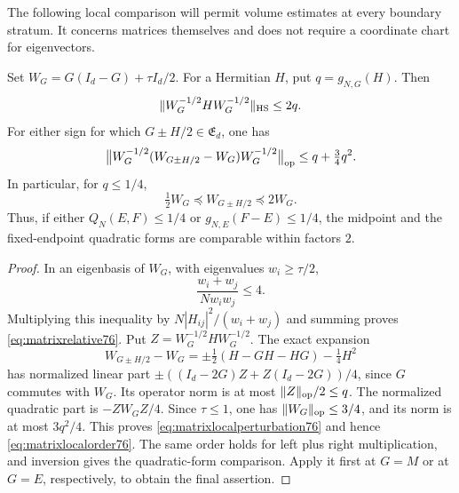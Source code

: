 The following local comparison will permit volume estimates at
every boundary stratum.  It concerns matrices themselves and
does not require a coordinate chart for eigenvectors.

\begin{lemma}
\label{lem:matrixlocal76}
Set $W_G=G(I_d-G)+\tau I_d/2$.  For a Hermitian $H$, put
$q=g_{N,G}(H)$.  Then
\begin{equation}\label{eq:matrixrelative76}
 \|W_G^{-1/2}HW_G^{-1/2}\|_{\rm HS}\le2q.
\end{equation}
For either sign for which $G\pm H/2\in\mathfrak E_d$, one has
\begin{equation}\label{eq:matrixlocalperturbation76}
 \bigl\|W_G^{-1/2}(W_{G\pm H/2}-W_G)W_G^{-1/2}\bigr\|_{\rm op}
                       \le q+\tfrac34q^2.
\end{equation}
In particular, for $q\le1/4$,
\begin{equation}\label{eq:matrixlocalorder76}
 \tfrac12W_G\preceq W_{G\pm H/2}\preceq2W_G.
\end{equation}
Thus, if either $Q_N(E,F)\le1/4$ or
$g_{N,E}(F-E)\le1/4$, the midpoint and the fixed-endpoint
quadratic forms are comparable within factors $2$.
\end{lemma}
\begin{proof}
In an eigenbasis of $W_G$, with eigenvalues $w_i\ge\tau/2$,
\[
 \frac{w_i+w_j}{Nw_iw_j}\le4.
\]
Multiplying this inequality by
$N|H_{ij}|^2/(w_i+w_j)$ and summing proves
\eqref{eq:matrixrelative76}.  Put
$Z=W_G^{-1/2}HW_G^{-1/2}$.  The exact expansion
\[
 W_{G\pm H/2}-W_G
            =\pm\tfrac12(H-GH-HG)-\tfrac14H^2
\]
has normalized linear part
$\pm((I_d-2G)Z+Z(I_d-2G))/4$, since $G$ commutes with
$W_G$.  Its operator norm is at most $\|Z\|_{\rm op}/2\le q$.
The normalized quadratic part is $-ZW_GZ/4$.
Since $\tau\le1$, one has $\|W_G\|_{\rm op}\le3/4$, and
its norm is at most $3q^2/4$.  This proves
\eqref{eq:matrixlocalperturbation76} and hence
\eqref{eq:matrixlocalorder76}.  The same order holds for left
plus right multiplication, and inversion gives the quadratic-form
comparison.  Apply it first at $G=M$ or at $G=E$, respectively,
to obtain the final assertion.
\end{proof}
